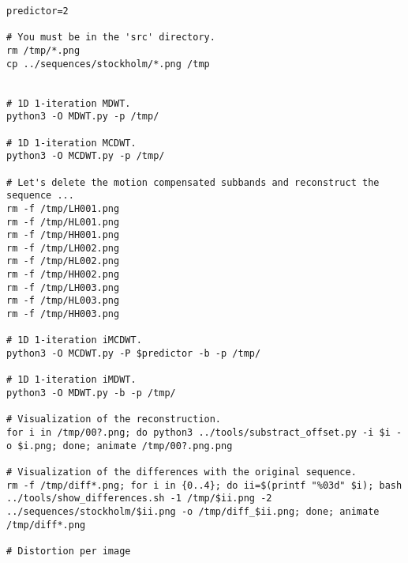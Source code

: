 \begin{verbatim}
predictor=2

# You must be in the 'src' directory.
rm /tmp/*.png
cp ../sequences/stockholm/*.png /tmp


# 1D 1-iteration MDWT.
python3 -O MDWT.py -p /tmp/

# 1D 1-iteration MCDWT.
python3 -O MCDWT.py -p /tmp/

# Let's delete the motion compensated subbands and reconstruct the sequence ...
rm -f /tmp/LH001.png
rm -f /tmp/HL001.png
rm -f /tmp/HH001.png
rm -f /tmp/LH002.png
rm -f /tmp/HL002.png
rm -f /tmp/HH002.png
rm -f /tmp/LH003.png
rm -f /tmp/HL003.png
rm -f /tmp/HH003.png

# 1D 1-iteration iMCDWT.
python3 -O MCDWT.py -P $predictor -b -p /tmp/

# 1D 1-iteration iMDWT.
python3 -O MDWT.py -b -p /tmp/

# Visualization of the reconstruction.
for i in /tmp/00?.png; do python3 ../tools/substract_offset.py -i $i -o $i.png; done; animate /tmp/00?.png.png

# Visualization of the differences with the original sequence.
rm -f /tmp/diff*.png; for i in {0..4}; do ii=$(printf "%03d" $i); bash ../tools/show_differences.sh -1 /tmp/$ii.png -2 ../sequences/stockholm/$ii.png -o /tmp/diff_$ii.png; done; animate /tmp/diff*.png

# Distortion per image

\end{verbatim}


